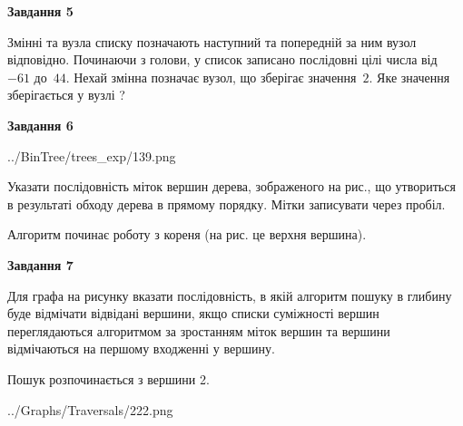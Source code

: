 \documentclass[12pt, ukrainian]{article}
\begin{document}
{\begin {large}
{\begin {center}\textbf{Завдання 5}\end {center}}\par
Змінні  та  вузла списку позначають наступний та попередній за ним вузол відповідно. Починаючи з голови, у список записано послідовні цілі числа від~$-61$ до~$44$. Нехай змінна  позначає вузол, що зберігає значення~$2$.
Яке значення зберігається у вузлі  ?\par
\newpage

{\begin {center}\textbf{Завдання 6}\end {center}}\par

\begin{center}
	{../BinTree/trees_exp/139.png}
\end{center}
Указати послідовність міток вершин дерева, зображеного на рис., що утвориться в результаті обходу дерева в прямому порядку. Мітки записувати через пробіл.\par Алгоритм починає роботу з кореня (на рис. це верхня вершина).\par
\newpage

{\begin {center}\textbf{Завдання 7}\end {center}}\par
Для графа на рисунку вказати послідовність, в якій алгоритм пошуку в глибину буде відмічати відвідані вершини, якщо списки суміжності вершин переглядаються алгоритмом за зростанням міток вершин та вершини відмічаються на першому вход\-женні у вершину.\par
Пошук розпочинається з вершини 2.\par

\begin{center}
	{../Graphs/Traversals/222.png}
\end{center}\par
\newpage


\end{large}}
\end{document}

